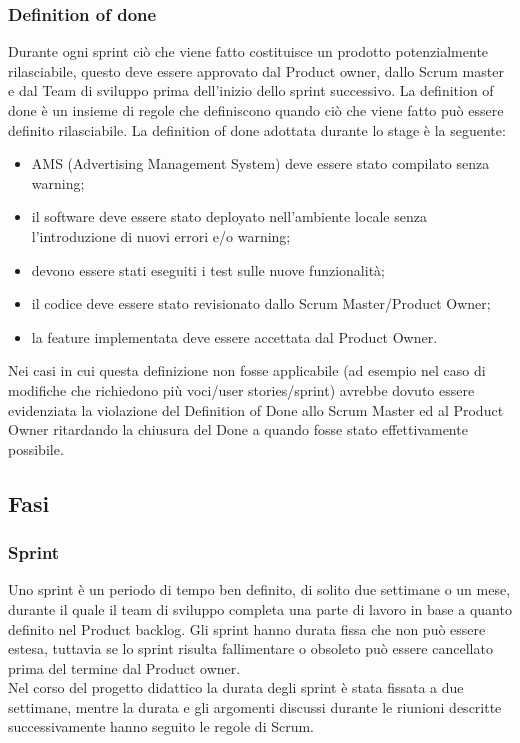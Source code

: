 \subsubsection{Definition of done}
Durante ogni sprint ciò che viene fatto costituisce un prodotto potenzialmente rilasciabile, questo deve essere approvato dal Product owner, dallo Scrum master e dal Team di sviluppo prima dell'inizio dello sprint successivo. La definition of done è un insieme di regole che definiscono quando ciò che viene fatto può essere definito rilasciabile.
La definition of done adottata durante lo stage è la seguente:
\begin{itemize}
    \item AMS (Advertising Management System) deve essere stato compilato senza warning;
    \item il software deve essere stato deployato nell’ambiente locale senza l'introduzione di nuovi errori e/o warning;
    \item devono essere stati eseguiti i test sulle nuove funzionalità;
    \item il codice deve essere stato revisionato dallo Scrum Master/Product Owner;
    \item la feature implementata deve essere accettata dal Product Owner.
\end{itemize}
Nei casi in cui questa definizione non fosse applicabile (ad esempio nel caso di modifiche che richiedono più voci/user stories/sprint) avrebbe dovuto essere evidenziata la violazione del Definition of Done allo Scrum Master ed al Product Owner ritardando la chiusura del Done a quando fosse stato effettivamente possibile.



\subsection{Fasi}

\subsubsection{Sprint}
Uno sprint è un periodo di tempo ben definito, di solito due settimane o un mese, durante il quale il team di sviluppo completa una parte di lavoro in base a quanto definito nel Product backlog.
Gli sprint hanno durata fissa che non può essere estesa, tuttavia se lo sprint risulta fallimentare o obsoleto può essere cancellato prima del termine dal Product owner.
\\Nel corso del progetto didattico la durata degli sprint è stata fissata a due settimane, mentre la durata e gli argomenti discussi durante le riunioni descritte successivamente hanno seguito le regole di Scrum.

